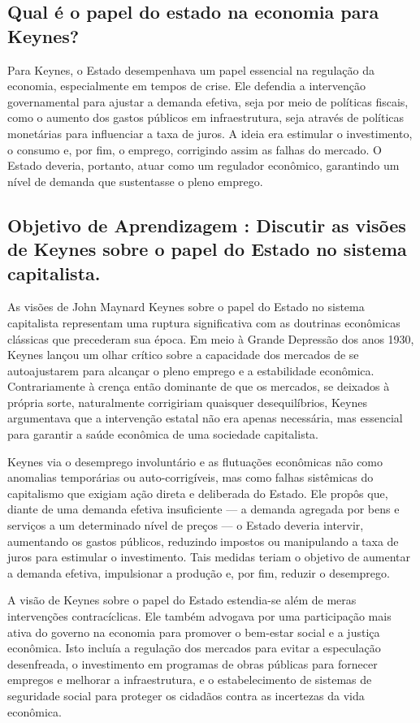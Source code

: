 \documentclass[a4paper,12pt]{article}[abntex2]
\begin{document}
\subsection{\textbf{Qual é o papel do estado na economia para Keynes?}}
Para Keynes, o Estado desempenhava um papel essencial na regulação da economia, especialmente em tempos de crise. Ele defendia a intervenção governamental para ajustar a demanda efetiva, seja por meio de políticas fiscais, como o aumento dos gastos públicos em infraestrutura, seja através de políticas monetárias para influenciar a taxa de juros. A ideia era estimular o investimento, o consumo e, por fim, o emprego, corrigindo assim as falhas do mercado. O Estado deveria, portanto, atuar como um regulador econômico, garantindo um nível de demanda que sustentasse o pleno emprego.
\subsection{\textbf{Objetivo de Aprendizagem : Discutir as visões de Keynes sobre o papel do Estado no sistema capitalista.}}
As visões de John Maynard Keynes sobre o papel do Estado no sistema capitalista representam uma ruptura significativa com as doutrinas econômicas clássicas que precederam sua época. Em meio à Grande Depressão dos anos 1930, Keynes lançou um olhar crítico sobre a capacidade dos mercados de se autoajustarem para alcançar o pleno emprego e a estabilidade econômica. Contrariamente à crença então dominante de que os mercados, se deixados à própria sorte, naturalmente corrigiriam quaisquer desequilíbrios, Keynes argumentava que a intervenção estatal não era apenas necessária, mas essencial para garantir a saúde econômica de uma sociedade capitalista.

Keynes via o desemprego involuntário e as flutuações econômicas não como anomalias temporárias ou auto-corrigíveis, mas como falhas sistêmicas do capitalismo que exigiam ação direta e deliberada do Estado. Ele propôs que, diante de uma demanda efetiva insuficiente — a demanda agregada por bens e serviços a um determinado nível de preços — o Estado deveria intervir, aumentando os gastos públicos, reduzindo impostos ou manipulando a taxa de juros para estimular o investimento. Tais medidas teriam o objetivo de aumentar a demanda efetiva, impulsionar a produção e, por fim, reduzir o desemprego.

A visão de Keynes sobre o papel do Estado estendia-se além de meras intervenções contracíclicas. Ele também advogava por uma participação mais ativa do governo na economia para promover o bem-estar social e a justiça econômica. Isto incluía a regulação dos mercados para evitar a especulação desenfreada, o investimento em programas de obras públicas para fornecer empregos e melhorar a infraestrutura, e o estabelecimento de sistemas de seguridade social para proteger os cidadãos contra as incertezas da vida econômica.
\end{document}
